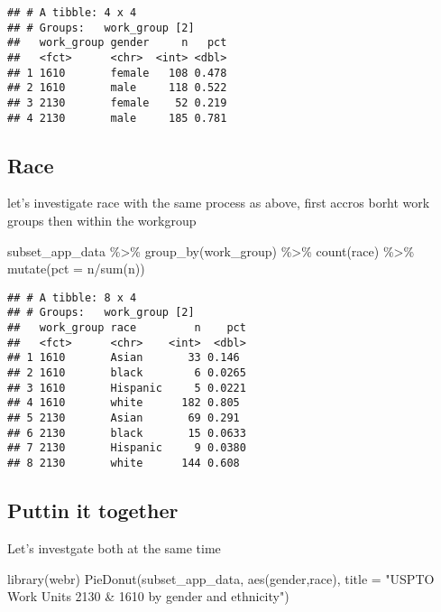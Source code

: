 \documentclass[
]{article}
\newenvironment{Shaded}{\begin{snugshade}}{\end{snugshade}}
\newcommand{\AttributeTok}[1]{\textcolor[rgb]{0.77,0.63,0.00}{#1}}
\newcommand{\FunctionTok}[1]{\textcolor[rgb]{0.00,0.00,0.00}{#1}}
\newcommand{\NormalTok}[1]{#1}
\newcommand{\SpecialCharTok}[1]{\textcolor[rgb]{0.00,0.00,0.00}{#1}}
\newcommand{\StringTok}[1]{\textcolor[rgb]{0.31,0.60,0.02}{#1}}
\begin{document}
\begin{verbatim}
## # A tibble: 4 x 4
## # Groups:   work_group [2]
##   work_group gender     n   pct
##   <fct>      <chr>  <int> <dbl>
## 1 1610       female   108 0.478
## 2 1610       male     118 0.522
## 3 2130       female    52 0.219
## 4 2130       male     185 0.781
\end{verbatim}

\hypertarget{race}{%
\subsection{Race}\label{race}}

let's investigate race with the same process as above, first accros
borht work groups then within the workgroup

\begin{Shaded}
\begin{Highlighting}[]
\NormalTok{subset\_app\_data }\SpecialCharTok{\%\textgreater{}\%}
  \FunctionTok{group\_by}\NormalTok{(work\_group) }\SpecialCharTok{\%\textgreater{}\%}
  \FunctionTok{count}\NormalTok{(race) }\SpecialCharTok{\%\textgreater{}\%} 
  \FunctionTok{mutate}\NormalTok{(}\AttributeTok{pct =}\NormalTok{ n}\SpecialCharTok{/}\FunctionTok{sum}\NormalTok{(n))}
\end{Highlighting}
\end{Shaded}

\begin{verbatim}
## # A tibble: 8 x 4
## # Groups:   work_group [2]
##   work_group race         n    pct
##   <fct>      <chr>    <int>  <dbl>
## 1 1610       Asian       33 0.146 
## 2 1610       black        6 0.0265
## 3 1610       Hispanic     5 0.0221
## 4 1610       white      182 0.805 
## 5 2130       Asian       69 0.291 
## 6 2130       black       15 0.0633
## 7 2130       Hispanic     9 0.0380
## 8 2130       white      144 0.608
\end{verbatim}

\hypertarget{puttin-it-together}{%
\subsection{Puttin it together}\label{puttin-it-together}}

Let's investgate both at the same time

\begin{Shaded}
\begin{Highlighting}[]
\FunctionTok{library}\NormalTok{(webr)}
\FunctionTok{PieDonut}\NormalTok{(subset\_app\_data, }\FunctionTok{aes}\NormalTok{(gender,race), }\AttributeTok{title =} \StringTok{"USPTO Work Units 2130 \& 1610 by gender and ethnicity"}\NormalTok{)}
\end{Highlighting}
\end{Shaded}
\end{document}
